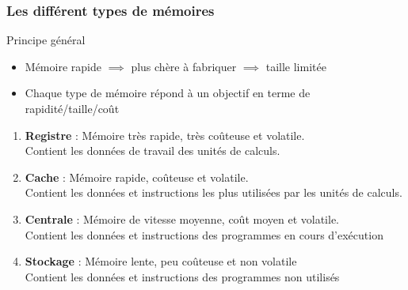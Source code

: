 \documentclass[8pt]{beamer}
\begin{document}
\begin{frame}
    \frametitle{Les différent types de mémoires}
    \begin{block}{Principe général}
        \begin{itemize}
            \item M\'emoire rapide $\implies$ plus  ch\`ere \`a
                  fabriquer $\implies$ taille  limit\'ee
            \item Chaque type de m\'emoire r\'epond \`a un objectif en
                  terme de rapidit\'e/taille/co\^ut
        \end{itemize}
    \end{block}
    \begin{enumerate}
        \item \textbf{Registre} : Mémoire très rapide, très coûteuse et
              volatile. \\
              Contient les données de travail des unités de calculs.
        \item \textbf{Cache} : Mémoire rapide, coûteuse et volatile. \\
              Contient les données et instructions les plus utilisées par les
              unités de calculs.
        \item \textbf{Centrale} : Mémoire de vitesse moyenne, coût moyen et
              volatile. \\
              Contient les données et instructions des programmes en cours
              d'exécution
        \item \textbf{Stockage} : Mémoire lente, peu coûteuse et non volatile
              \\
              Contient les données et instructions des programmes non utilisés
              \\
    \end{enumerate}

\end{frame}
\end{document}
